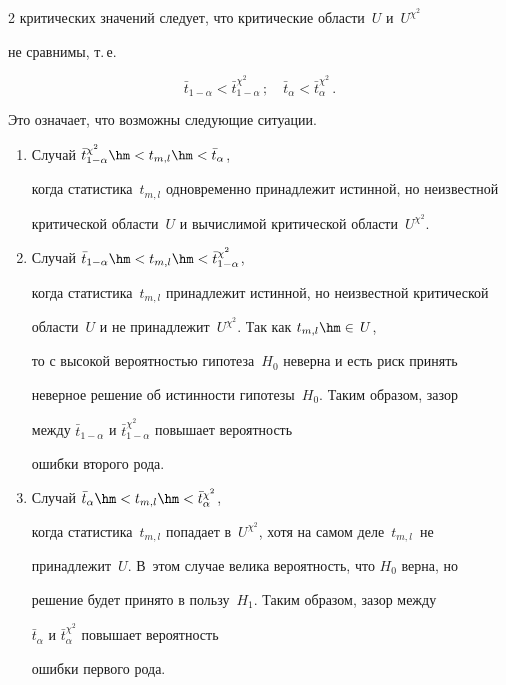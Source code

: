 \begin{multicols}{2}
  критических значений следует, что критические области~$U$ и~$U^{\chi^2}$

  не сравнимы, т.\,е.\

 $$

 \bar{t}_{1-\alpha} < \bar{t}_{1-\alpha}^{\chi^2}\,; \quad

 \bar{t}_{\alpha} < \bar{t}_{\alpha}^{\chi^2}\,.$$

 Это означает, что возможны следующие ситуации.

 \begin{enumerate}

 \item Случай $\bar{t}_{1-\alpha}^{\chi^2} \hm< t_{m,l} \hm< \bar{t}_{\alpha}$,

 когда статистика~$t_{m,l}$ одновременно принадлежит истинной, но неизвестной

 критической области~$U$ и вычислимой критической области~$U^{\chi^2}$.

 \item Случай $\bar{t}_{1-\alpha} \hm< t_{m,l}\hm < \bar{t}_{1-\alpha}^{\chi^2}$,

 когда статистика~$t_{m,l}$ принадлежит истинной, но неизвестной критической

 области~$U$ и не принадлежит~$U^{\chi^2}$. Так как $t_{m,l}\hm\in\,U$,

 то с высокой вероятностью гипотеза~$H_0$ неверна и есть риск принять

 неверное решение об истинности гипотезы~$H_0$. Таким образом, зазор

 между $\bar{t}_{1-\alpha}$ и $\bar{t}_{1-\alpha}^{\chi^2}$ повышает вероятность

 ошибки второго рода.

  \item Случай $\bar{t}_{\alpha} \hm< t_{m,l} \hm< \bar{t}_{\alpha}^{\chi^2}$,

  когда статистика~$t_{m,l}$ попадает в~$U^{\chi^2}$, хотя на самом деле~$t_{m,l}$~не

  принадлежит~$U$. В~этом случае велика вероятность, что $H_0$ верна, но

  решение будет принято в пользу~$H_1$. Таким образом, зазор между

  $\bar{t}_{\alpha}$ и $\bar{t}_{\alpha}^{\chi^2}$ повышает вероятность

  ошибки первого рода.

 \end{enumerate}




\end{multicols}
